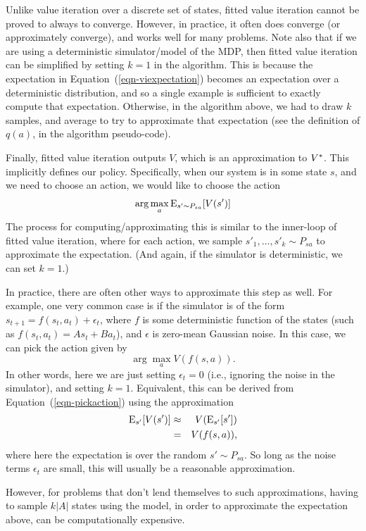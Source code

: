 \documentclass{article}
\begin{document}
Unlike value iteration over a discrete set of states, fitted value iteration cannot be proved to always to converge.
However, in practice, it often does converge (or approximately converge), and works well for many problems.
Note also that if we are using a deterministic simulator/model of the MDP, then fitted value iteration can be
simplified by setting $k=1$ in the algorithm.
This is because the expectation in Equation~(\ref{eqn-viexpectation}) becomes an expectation over
a deterministic distribution, and so a single example is sufficient to exactly compute that expectation.
Otherwise, in the algorithm above, we had to draw $k$ samples, and average to try to approximate that
expectation (see the definition of $q(a)$, in the algorithm pseudo-code).

Finally, fitted value iteration outputs $V$, which is an approximation to ${V^{\ast}}$.  This implicitly defines
our policy.  Specifically,
when our system is in some state $s$, and we need to choose an action, we would like to choose the action
\begin{equation}
\arg \max_a {\rm E}_{s'\sim P_{sa}}[V(s')]                \label{eqn-pickaction}
\end{equation}
The process for computing/approximating this is similar to the inner-loop of fitted value iteration, where
for each action, we sample $s'_1, \ldots, s'_k \sim P_{sa}$ to approximate the expectation.  (And again,
if the simulator is deterministic, we can set $k=1$.)

In practice, there are often other ways to approximate this step as well.  For example, one very common
case is if the
simulator is of the form $s_{t+1} = f(s_t, a_t) + \epsilon_t$, where $f$ is some deterministic function
of the states (such as $f(s_t,a_t) = As_t+Ba_t$), and $\epsilon$ is zero-mean Gaussian noise.  In this case,
we can pick the action given by
\[
\arg \max_a V(f(s,a)).
\]
In other words, here we are just setting $\epsilon_t = 0$ (i.e., ignoring the noise in the simulator),
and setting $k=1$.  Equivalent, this can be derived from Equation~(\ref{eqn-pickaction}) using
the approximation
\begin{eqnarray}
{\rm E}_{s'}[V(s')] &\approx& V({\rm E}_{s'}[s'])  \\
&=& V(f(s,a)),
\end{eqnarray}
where here the expectation is over the random $s' \sim P_{sa}$.
So long as the noise terms $\epsilon_t$ are small, this will usually
be a reasonable approximation.

However, for problems that don't lend themselves
to such approximations, having to sample $k|A|$ states using the model, in order
to approximate the expectation above, can be computationally expensive.


\end{document}
